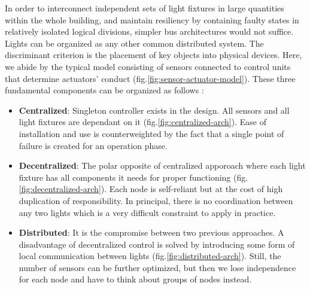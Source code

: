 \documentclass[11pt, english, a4paper, twoside]{article}
\begin{document}
In order to interconnect independent sets of light fixtures in large quantities within the whole building, and maintain resiliency by containing faulty states in relatively isolated logical divisions, simpler bus architectures would not suffice. Lights can be organized as any other common distributed system. The discriminant criterion is the placement of key objects into physical devices. Here, we abide by the typical model consisting of sensors connected to control units that determine actuators' conduct (fig.\ref{fig:sensor-actuator-model}). These three fundamental components can be organized as follows \cite{wen_intelligent_2018}:
\begin{itemize}
	\itemsep0em 
	\item \textbf{Centralized}: Singleton controller exists in the design. All sensors and all light fixtures are dependant on it (fig.\ref{fig:centralized-arch}). Ease of installation and use is counterweighted by the fact that a single point of failure is created for an operation phase.
	\item \textbf{Decentralized}: The polar opposite of centralized apporoach where each light fixture has all components it needs for proper functioning (fig.\ref{fig:decentralized-arch}). Each node is self-reliant but at the cost of high duplication of responsibility. In principal, there is no coordination between any two lights which is a very difficult constraint to apply in practice.
	\item \textbf{Distributed}: It is the compromise between two previous approaches. A disadvantage of decentralized control is solved by introducing some form of local communication between lights (fig.\ref{fig:distributed-arch}). Still, the number of sensors can be further optimized, but then we lose independence for each node and have to think about groups of nodes instead.
\end{itemize}
\end{document}
